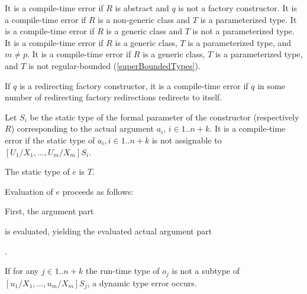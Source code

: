 \documentclass[makeidx]{article}
\begin{document}
{\LMHash{}%
It is a compile-time error if $R$ is abstract
and $q$ is not a factory constructor.
It is a compile-time error if $R$ is a non-generic class
and $T$ is a parameterized type.
It is a compile-time error if $R$ is a generic class
and $T$ is not a parameterized type.
It is a compile-time error if $R$ is a generic class,
$T$ is a parameterized type, and $m \not= p$.
It is a compile-time error if $R$ is a generic class,
$T$ is a parameterized type,
and $T$ is not regular-bounded
(\ref{superBoundedTypes}).

\LMHash{}%
If $q$ is a redirecting factory constructor,
it is a compile-time error if $q$ in some number of
redirecting factory redirections redirects to itself.

\LMHash{}%
Let $S_i$ be the static type of
the formal parameter of the constructor  (respectively $R$)
corresponding to the actual argument $a_i$, $i \in 1 .. n+k$.
It is a compile-time error if the static type of
$a_i, i \in 1 .. n + k$
is not assignable to $[U_1/X_1, \ldots, U_m/X_m]S_i$.

\LMHash{}%
The static type of $e$ is $T$.

\LMHash{}%
Evaluation of $e$ proceeds as follows:

\LMHash{}%
First, the argument part


\noindent
is evaluated, yielding the evaluated actual argument part

.

\noindent
{}
If for any
$j \in 1 .. n + k$
the run-time type of $o_j$ is not a subtype of
$[u_1/X_1, \ldots, u_m/X_m]S_j$,
a dynamic type error occurs.

}
\end{document}
